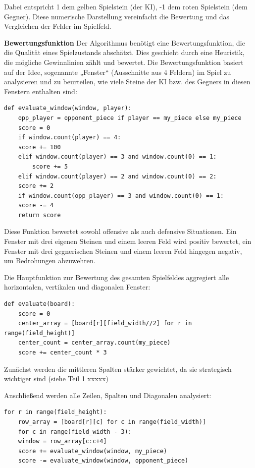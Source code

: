 Dabei entspricht 1 dem gelben Spielstein (der KI), -1 dem roten Spielstein (dem Gegner). Diese numerische Darstellung vereinfacht die Bewertung und das Vergleichen der Felder im Spielfeld.

\textbf{Bewertungsfunktion}
Der Algorithmus benötigt eine Bewertungsfunktion, die die Qualität eines Spielzustands abschätzt. Dies geschieht durch eine Heuristik, die mögliche Gewinnlinien zählt und bewertet.
Die Bewertungsfunktion basiert auf der Idee, sogenannte „Fenster“ (Ausschnitte aus 4 Feldern) im Spiel zu analysieren und zu beurteilen, wie viele Steine der KI bzw. des Gegners in diesen Fenstern enthalten sind:

\begin{lstlisting}[style=pythonstyle]
	def evaluate_window(window, player):
	opp_player = opponent_piece if player == my_piece else my_piece
	score = 0
	if window.count(player) == 4:
	score += 100
	elif window.count(player) == 3 and window.count(0) == 1:
		score += 5
	elif window.count(player) == 2 and window.count(0) == 2:
	score += 2
	if window.count(opp_player) == 3 and window.count(0) == 1:
	score -= 4
	return score
\end{lstlisting}

Diese Funktion bewertet sowohl offensive als auch defensive Situationen. Ein Fenster mit drei eigenen Steinen und einem leeren Feld wird positiv bewertet, ein Fenster mit drei gegnerischen Steinen und einem leeren Feld hingegen negativ, um Bedrohungen abzuwehren.

Die Hauptfunktion zur Bewertung des gesamten Spielfeldes aggregiert alle horizontalen, vertikalen und diagonalen Fenster:

\begin{lstlisting}[style=pythonstyle]
	def evaluate(board):
	score = 0
	center_array = [board[r][field_width//2] for r in range(field_height)]
	center_count = center_array.count(my_piece)
	score += center_count * 3
\end{lstlisting}

Zunächst werden die mittleren Spalten stärker gewichtet, da sie strategisch wichtiger sind (siehe Teil 1 xxxxx)

Anschließend werden alle Zeilen, Spalten und Diagonalen analysiert:

\begin{lstlisting}[style=pythonstyle]
	for r in range(field_height):
	row_array = [board[r][c] for c in range(field_width)]
	for c in range(field_width - 3):
	window = row_array[c:c+4]
	score += evaluate_window(window, my_piece)
	score -= evaluate_window(window, opponent_piece)
\end{lstlisting}

